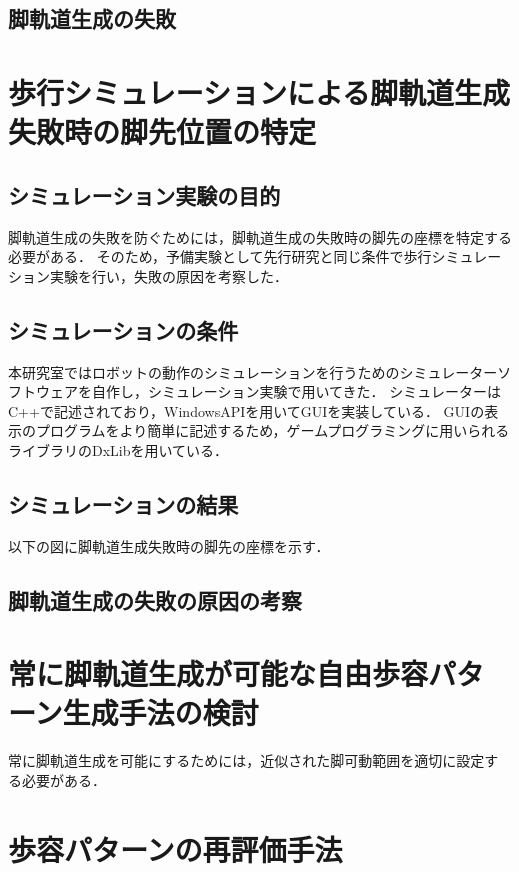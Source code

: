 \subsection{脚軌道生成の失敗}


\section{歩行シミュレーションによる脚軌道生成失敗時の脚先位置の特定}

\subsection{シミュレーション実験の目的}
脚軌道生成の失敗を防ぐためには，脚軌道生成の失敗時の脚先の座標を特定する必要がある．
そのため，予備実験として先行研究と同じ条件で歩行シミュレーション実験を行い，失敗の原因を考察した．

\subsection{シミュレーションの条件}
本研究室ではロボットの動作のシミュレーションを行うためのシミュレーターソフトウェアを自作し，シミュレーション実験で用いてきた．
シミュレーターはC++で記述されており，WindowsAPIを用いてGUIを実装している．
GUIの表示のプログラムをより簡単に記述するため，ゲームプログラミングに用いられるライブラリのDxLibを用いている．

\subsection{シミュレーションの結果}
以下の図に脚軌道生成失敗時の脚先の座標を示す．

\subsection{脚軌道生成の失敗の原因の考察}

\section{常に脚軌道生成が可能な自由歩容パターン生成手法の検討}
常に脚軌道生成を可能にするためには，近似された脚可動範囲を適切に設定する必要がある．


\section{歩容パターンの再評価手法}

